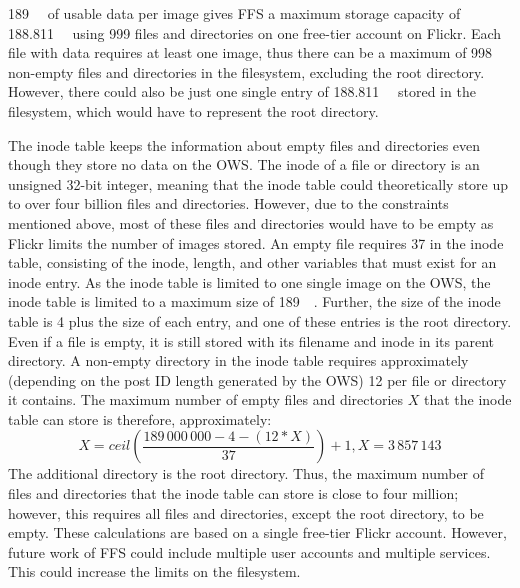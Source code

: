\SI{189}{\mega\byte} of usable data per image gives \gls{FFS} a maximum storage capacity of \SI{188.811}{\giga\byte} using 999 files and directories on one \mbox{free-tier} account on Flickr. Each file with data requires at least one image, thus there can be a maximum of 998 \mbox{non-empty} files and directories in the filesystem, excluding the root directory. However, there could also be just one single entry of \SI{188.811}{\giga\byte} stored in the filesystem, which would have to represent the root directory.

The inode table keeps the information about empty files and directories even though they store no data on the \gls{OWS}. The inode of a file or directory is an unsigned \mbox{32-bit} integer, meaning that the inode table could theoretically store up to over four billion files and directories. However, due to the constraints mentioned above, most of these files and directories would have to be empty as Flickr limits the number of images stored. An empty file requires \SI{37}{\byte} in the inode table, consisting of the inode, length, and other variables that must exist for an inode entry. As the inode table is limited to one single image on the \gls{OWS}, the inode table is limited to a maximum size of \SI{189}{\mega\byte}. Further, the size of the inode table is \SI{4}{\byte} plus the size of each entry, and one of these entries is the root directory. Even if a file is empty, it is still stored with its filename and inode in its parent directory. A \mbox{non-empty} directory in the inode table requires approximately (depending on the post ID length generated by the \gls{OWS}) \SI{12}{\byte} per file or directory it contains. The maximum number of empty files and directories $X$ that the inode table can store is therefore, approximately:
$$
	X = ceil(\frac{189\,000\,000 - 4 - (12 * X)}{37}) + 1, X = 3\,857\,143
$$
The additional directory is the root directory. Thus, the maximum number of files and directories that the inode table can store is close to four million; however, this requires all files and directories, except the root directory, to be empty. These calculations are based on a single \mbox{free-tier} Flickr account. However, future work of \gls{FFS} could include multiple user accounts and multiple services. This could increase the limits on the filesystem.

